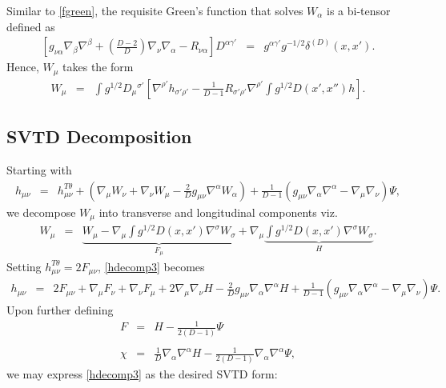 \documentclass[10pt,letterpaper]{article}
\numberwithin{equation}{section}
\begin{document}
Similar to \eqref{fgreen}, the requisite Green's function that solves $W_\alpha$ is a bi-tensor defined as
\begin{eqnarray}
\left[g_{\nu\alpha}\nabla_\beta\nabla^\beta + \left(\frac{D-2}{D}\right)\nabla_\nu \nabla_\alpha - R_{\nu\alpha}\right]D^{\alpha\gamma'} &=& g^{\alpha\gamma'} g^{-1/2} \delta^{(D)}(x,x').
\end{eqnarray}
Hence, $W_\mu$ takes the form
\begin{eqnarray}
W_{\mu} &=& \int g^{1/2} D_\mu{}^{\sigma'} \left[ \nabla^{\rho'} h_{\sigma'\rho'}-
 \frac{1}{D-1}R_{\sigma'\rho'}\nabla^{\rho'} \int g^{1/2} D(x',x'') h\right].
\end{eqnarray}
%
%
\subsection{SVTD Decomposition}
%
%
Starting with 
\begin{eqnarray}
h_{\mu\nu} &=& h_{\mu\nu}^{T\theta} + \left(\nabla_\mu W_\nu + \nabla_\nu W_\mu - \frac{2}{D}g_{\mu\nu}\nabla^\alpha W_\alpha\right) +\frac{1}{D-1}\left( g_{\mu\nu}\nabla_\alpha \nabla^\alpha - \nabla_\mu\nabla_\nu\right)\Psi,
\label{hdecomp3}
\end{eqnarray}
we decompose $W_{\mu}$ into transverse and longitudinal components viz.
\begin{eqnarray}
W_{\mu} &=& \underbrace{W_{\mu} -\nabla_\mu \int g^{1/2} D(x,x')\nabla^{\sigma}W_\sigma}_{F_{\mu}} + \nabla_\mu \underbrace{ \int g^{1/2}D(x,x')\nabla^\sigma W_\sigma}_{H}.
\end{eqnarray}
Setting $h_{\mu\nu}^{T\theta} = 2F_{\mu\nu}$, \eqref{hdecomp3} becomes
\begin{eqnarray}
h_{\mu\nu}&=& 2F_{\mu\nu} + \nabla_\mu F_\nu + \nabla_\nu F_\mu + 2 \nabla_\mu\nabla_\nu H - \frac{2}{D}g_{\mu\nu}\nabla_\alpha \nabla^\alpha H +\frac{1}{D-1}\left( g_{\mu\nu}\nabla_\alpha \nabla^\alpha - \nabla_\mu\nabla_\nu\right)\Psi.
\end{eqnarray}
Upon further defining
\begin{eqnarray}
F &=& H - \frac{1}{2(D-1)} \Psi
\\ \nonumber\\
\chi &=& \frac{1}{D}\nabla_\alpha\nabla^\alpha H - \frac{1}{2(D-1)}\nabla_\alpha\nabla^\alpha \Psi,
\end{eqnarray}
we may express \eqref{hdecomp3} as the desired SVTD form:
\end{document}
